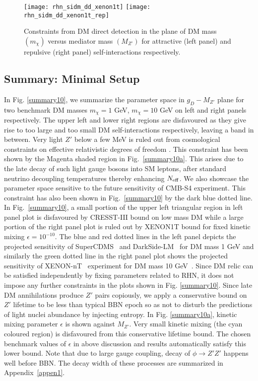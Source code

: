 \documentclass[prd,nofootinbib,preprint,superscriptaddress]{revtex4}
\begin{document}
\begin{figure}[h!]
\centering
\texttt{[image: rhn\_sidm\_dd\_xenon1t]}
\hfil
\texttt{[image: rhn\_sidm\_dd\_xenon1t\_rep]}
\caption{Constraints from DM direct detection in the plane of DM mass $(m_{\chi})$ versus mediator mass $(M_{Z'})$ for attractive (left panel) and repulsive (right panel) self-interactions respectively.}
\label{sidmdd}
\end{figure}

\subsection{Summary: Minimal Setup}
In Fig. \ref{summary10}, we summarize the parameter space in $g_D-M_{Z'}$ plane for two benchmark DM masses $m_{\chi}=1$ GeV, $m_{\chi}=10$ GeV on left and right panels respectively. The upper left and lower right regions are disfavoured as they give rise to too large and too small DM self-interactions respectively, leaving a band in between.  Very light $Z'$ below a few MeV is ruled out from cosmological constraints on effective relativistic degrees of freedom \cite{Aghanim:2018eyx, Kamada:2018zxi, Ibe:2019gpv, Escudero:2019gzq}. This constraint has been shown by the Magenta shaded region in Fig.~\ref{summary10a}. This arises due to the late decay of such light gauge bosons into SM leptons, after standard neutrino decoupling temperatures thereby enhancing $N_{\rm eff}$. We also showcase the parameter space sensitive to the future sensitivity of CMB-S4 experiment\cite{CMB-S4:2016ple,Ibe:2019gpv}. This constraint has also been shown in Fig.~\ref{summary10} by the dark blue dotted line. In Fig.~\ref{summary10}, a small portion of the upper left triangular region in left panel plot is disfavoured by CRESST-III bound on low mass DM while a large portion of the right panel plot is ruled out by XENON1T bound for fixed kinetic mixing $\epsilon = 10^{-10}$. The blue and red dotted lines in the left panel depicts the projected sensitivity of SuperCDMS~\cite{SuperCDMS:2016wui} and DarkSide-LM~\cite{DarkSide:2018bpj} for DM mass 1 GeV and similarly the green dotted line in the right panel plot shows the projected sensitivity of XENON-nT~\cite{XENON:2020kmp} experiment for DM mass 10 GeV~\cite{EuropeanStrategyforParticlePhysicsPreparatoryGroup:2019qin}. Since DM relic can be satisfied independently by fixing parameters related to RHN, it does not impose any further constraints in the plots shown in Fig. \ref{summary10}. Since late DM annihilations produce $Z'$ pairs copiously, we apply a conservative bound on $Z'$ lifetime to be less than typical BBN epoch so as not to disturb the predictions of light nuclei abundance by injecting entropy. In Fig. \ref{summary10a}, kinetic mixing parameter $\epsilon$ is shown against $M_{Z'}$. Very small kinetic mixing (the cyan coloured region) is disfavoured from this conservative lifetime bound. The chosen benchmark values of $\epsilon$ in above discussion and results automatically satisfy this lower bound. Note that due to large gauge coupling, decay of $\phi \to Z'Z'$ happens well before BBN. The decay width of these processes are summarized in Appendix~\ref{appen1}.
\end{document}
